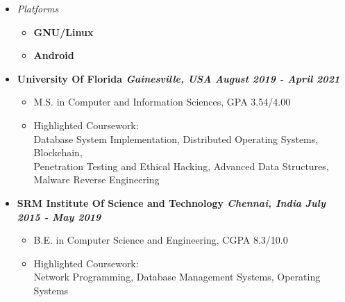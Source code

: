 \documentclass[9]{Resume}
\begin{document}
\begin{minipage}[t]{0.45\textwidth}
\begin{itemize}[noitemsep,nolistsep,leftmargin=*]
	\item[]\textit{Platforms}
			\vspace{-1em}
			\begin{multicols}{2}
			\begin{itemize}[leftmargin=*]
			\setlength\itemsep{-0.25em}
			\item[]\textbf{GNU/Linux}\hspace{5pt}
			\item[]\textbf{Android}\hspace{5pt}
			\end{itemize}
			\end{multicols}
	\end{itemize}
		
\end{minipage}


\begin{itemize}[noitemsep,nolistsep]
	\item[]\textbf{University Of Florida \textit{{\scriptsize Gainesville, USA}} \hfill \textit{August 2019 - April 2021}}
		\begin{itemize}[leftmargin=*]
			\setlength\itemsep{-0.25em}
			\item[\textbullet]M.S. in Computer and Information Sciences, GPA 3.54/4.00
			\item[\textbullet]{\small Highlighted Coursework:\\
										Database System Implementation, Distributed Operating Systems, Blockchain,\\
										Penetration Testing and Ethical Hacking, Advanced Data Structures, Malware Reverse Engineering}
		\end{itemize}
	\item[]\textbf{SRM Institute Of Science and Technology \textit{{\scriptsize Chennai, India}} \hfill \textit{July 2015 - May 2019}}
		\begin{itemize}[leftmargin=*]
			\setlength\itemsep{-0.25em}
			\item[\textbullet]B.E. in Computer Science and Engineering, CGPA 8.3/10.0
			\item[\textbullet]{\small Highlighted Coursework:\\
										Network Programming, Database Management Systems, Operating Systems}
		\end{itemize}
\end{itemize}
\end{document}
